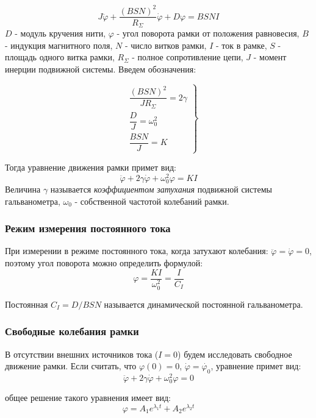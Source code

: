\documentclass[a4paper, 12pt]{article}
\begin{document}
\begin{equation}
J \ddot{\varphi} + \dfrac{\left(BSN\right)^2}{R_{\Sigma}} \dot{\varphi} + D\varphi = BSNI
\end{equation}
$D$ - модуль кручения нити, $\varphi$ - угол поворота рамки от положения равновесия, $B$ - индукция магнитного поля, $N$ - число витков рамки, $I$ - ток в рамке, $S$ - площадь одного витка рамки, $R_{\Sigma}$ - полное сопротивление цепи, $J$ - момент инерции подвижной системы.
Введем обозначения:

\begin{equation}
\left.
\begin{aligned}
&\dfrac{(BSN)^2}{JR_{\Sigma}} = 2\gamma \\
&\dfrac{D}{J} = \omega_0^2 \\
&\dfrac{BSN}{J} = K 
\end{aligned}
\right\}
\end{equation}

Тогда уравнение движения рамки примет вид:
\begin{equation}
\label{eq:diff}
\ddot{\varphi} +2\gamma\dot{\varphi} + \omega_0^2 \varphi = KI
\end{equation}
Величина $\gamma$ называется \textit{коэффициентом затухания} подвижной системы гальванометра,  $\omega_0$ - собственной частотой колебаний рамки.

\subsubsection*{Режим измерения постоянного тока}
При измерении в режиме постоянного тока, когда затухают колебания: $\ddot{\varphi} = \dot{\varphi} = 0$, поэтому угол поворота можно определить формулой:
$$\varphi = \dfrac{KI}{\omega_0^2} = \dfrac{I}{C_I}$$

Постоянная $C_I = D/BSN$ называется динамической постоянной гальванометра.

\subsubsection*{Свободные колебания рамки}

В отсутствии внешних источников тока ($I = 0$) будем исследовать свободное движение рамки.
Если считать, что $\varphi(0) = 0$, $\dot{\varphi} = \dot{\varphi_0}$, уравнение примет вид:
$$\ddot{\varphi} +2 \gamma \dot{\varphi} + \omega^2_0 \varphi = 0$$

общее решение такого уравнения имеет вид:
\begin{equation}
\varphi = A_1 e^{\lambda_1t} + A_2e^{\lambda_2t}
\label{eq:sol}
\end{equation}
\end{document}
